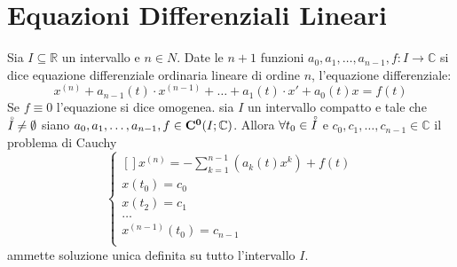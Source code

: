 \section{Equazioni Differenziali Lineari}
Sia $I\subseteq\mathbb{R}$ un intervallo e $n\in N$. Date le $n+1$ funzioni $a_0,a_1,\ldots,a_{n-1}, f:I\to\mathbb{C}$ si dice equazione differenziale ordinaria lineare di ordine $n$, l'equazione differenziale:
$$x^{(n)}+a_{n-1}(t)\cdot x^{(n-1)}+\ldots+a_1(t)\cdot x'+a_0(t)x=f(t)$$
Se $f\equiv 0 $ l'equazione si dice omogenea.
\proposition
sia $I$ un intervallo compatto e tale che $\accentset{\circ}{I}\ne \emptyset$ siano $a_0,a_1,\ldots,a_{n-1},f\in \mathbf{C^{0}}(I;\mathbb{C})$. Allora $\forall t_0\in\accentset{\circ}{I}$ e $c_0,c_1,\ldots,c_{n-1}\in\mathbb{C}$ il problema di Cauchy 
$$ \left\{\begin{matrix}[]
x^{(n)}=-\sum\limits_{k=1}^{n-1}\left(a_k(t)x^k\right)+f(t)\\
x(t_0)=c_0\\
x(t_2)=c_1\\
\ldots\\
x^{(n-1)}(t_0)=c_{n-1}\\
\end{matrix}\right.$$
ammette soluzione unica definita su tutto l'intervallo $I$.

